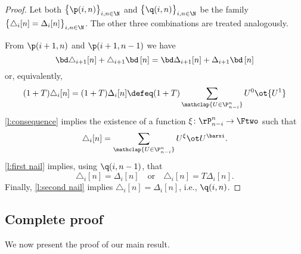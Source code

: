 \begin{proof}
	Let both $\big\{ \p(i,n) \big\}_{i,n\in\N}$ and $\big\{ \q(i,n) \big\}_{i,n\in\N}$ be the family $\big\{ \triangle_i [n] = \Delta_i [n] \big\}_{i,n \in \N}$.
	The other three combinations are treated analogously.

	From $\p(i+1,n)$ and $\p(i+1,n-1)$ we have
	\[
	\bd \triangle_{i+1} [n] + \triangle_{i+1} \bd \, [n] =
	\bd \Delta_{i+1} [n] + \Delta_{i+1} \bd \, [n]
	\]
	or, equivalently,
	\begin{align*}
	(1+T) \triangle_i [n] =
	(1+T) \Delta_i [n] \defeq
	(1+T) \sum_{\mathclap{U \in \P_{n-i}^n}} {U^0} \ot {U^1}
	\end{align*}
	\cref{l:consequence} implies the existence of a function $\xi \colon \rP_{n-i}^n \to \Ftwo$ such that
	\[
	\triangle_i [n] =
	\sum_{\mathclap{U \in \P_{n-i}^n}} U^\xi \ot U^\barxi.
	\]
	\cref{l:first nail} implies, using $\q(i,n-1)$, that
	\[
	\triangle_i [n] = \Delta_i [n]
	\quad \text{or} \quad
	\triangle_i [n] = T \Delta_i [n].
	\]
	Finally, \cref{l:second nail} implies $\triangle_i [n] = \Delta_i [n]$, i.e., $\q(i,n)$.
\end{proof}

\subsection{Complete proof}\label{ss:proof}

We now present the proof of our main result.

